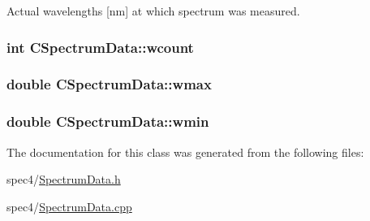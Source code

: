 Actual wavelengths \mbox{[}nm\mbox{]} at which spectrum was measured. 

\hypertarget{classCSpectrumData_a4ad75480bbfcc126e5c33c47021cc393}{
\subsubsection[{wcount}]{\setlength{\rightskip}{0pt plus 5cm}int {\bf CSpectrumData::wcount}}}
\label{classCSpectrumData_a4ad75480bbfcc126e5c33c47021cc393}
\hypertarget{classCSpectrumData_a6f3d5bafa576e363c7cee48c2fd2612f}{
\subsubsection[{wmax}]{\setlength{\rightskip}{0pt plus 5cm}double {\bf CSpectrumData::wmax}}}
\label{classCSpectrumData_a6f3d5bafa576e363c7cee48c2fd2612f}
\hypertarget{classCSpectrumData_ae983387d5ee053605067fcd9c6de834d}{
\subsubsection[{wmin}]{\setlength{\rightskip}{0pt plus 5cm}double {\bf CSpectrumData::wmin}}}
\label{classCSpectrumData_ae983387d5ee053605067fcd9c6de834d}


The documentation for this class was generated from the following files:\begin{DoxyCompactItemize}
\item 
spec4/\hyperlink{SpectrumData_8h}{SpectrumData.h}\item 
spec4/\hyperlink{SpectrumData_8cpp}{SpectrumData.cpp}\end{DoxyCompactItemize}
